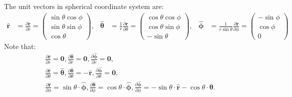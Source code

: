 \documentclass[MSc,beforeExam]{iitcsthesis}
\newcommand{\deriv}[2]{\frac{\partial #1}{\partial #2}}
\newcommand{\mat}[2]{\left(\begin{array}{#1}#2\end{array}\right)}
\newcommand\br{\boldsymbol{r}}
\newcommand\brhat{\hat{\br}}
\newcommand\btheta{\boldsymbol{\theta}}
\newcommand\bthetahat{\hat{\btheta}}
\newcommand\bphi{\boldsymbol{\phi}}
\newcommand\bphihat{\hat{\bphi}}
\begin{document}
The unit vectors in spherical coordinate system are:
\begin{align}
 \brhat &= \deriv{\br}{r}
 = \mat{c}{\sin\theta \cos\phi \\ \sin\theta \sin\phi \\ \cos\theta} ,&
 \bthetahat &= \frac{1}{r} \deriv{\br}{\theta}
 = \mat{c}{\cos\theta \cos\phi \\ \cos\theta \sin\phi \\ -\sin\theta} ,&
 \bphihat &= \frac{1}{r \sin \theta} \deriv{\br}{\phi}
 = \mat{c}{-\sin\phi \\ \cos\phi \\ 0}
\end{align}
Note that:
\begin{align}
  \deriv{\brhat}{r} = \mathbf{0} , \nonumber
  \deriv{\bthetahat}{r} = \mathbf{0} , 
  \deriv{\bphihat}{r} = \mathbf{0}, \\
  \deriv{\brhat}{\theta} = \bthetahat , 
  \deriv{\bthetahat}{\theta} = -\brhat , 
  \deriv{\bphihat}{\theta} = \mathbf{0}, \\
  \deriv{\brhat}{\phi} = \sin \theta \cdot \bphihat , \nonumber
  \deriv{\bthetahat}{\phi} = \cos \theta \cdot \bphihat , 
  \deriv{\bphihat}{\phi} = -\sin \theta \cdot \brhat -\cos \theta \cdot \bthetahat.
\end{align}
\end{document}
